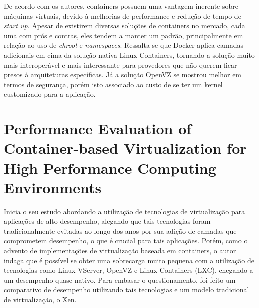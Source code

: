 \documentclass[twoside,english,brazilian]{UNISINOSmonografia}
\begin{document}
De acordo com os autores, containers possuem uma vantagem inerente sobre máquinas virtuais, devido à melhorias de performance e redução de tempo de \textit{start up}. Apesar de existirem diversas soluções de containers no mercado, cada uma com prós e contras, eles tendem a manter um padrão, principalmente em relação ao uso de \textit{chroot} e \textit{namespaces}. Ressalta-se que Docker aplica camadas adicionais em cima da solução nativa Linux Containers, tornando a solução muito mais interoperável e mais interessante para provedores que não querem ficar presos à arquiteturas específicas. Já a solução OpenVZ se mostrou melhor em termos de segurança, porém isto associado ao custo de se ter um kernel customizado para a aplicação.

\section{Performance Evaluation of Container-based Virtualization for High Performance Computing Environments}
\cite{Xavier2013} Inicia o seu estudo abordando a utilização de tecnologias de virtualização para aplicações de alto desempenho, alegando que tais tecnologias foram tradicionalmente evitadas ao longo dos anos por sua adição de camadas que comprometem desempenho, o que é crucial para tais aplicações. Porém, como o advento de implementações de virtualização baseada em containers, o autor indaga que é possível se obter uma sobrecarga muito pequena com a utilização de tecnologias como Linux VServer, OpenVZ e Linux Containers (LXC), chegando a um desempenho quase nativo. Para embasar o questionamento, foi feito um comparativo de desempenho utilizando tais tecnologias e um modelo tradicional de virtualização, o Xen. 
\end{document}
